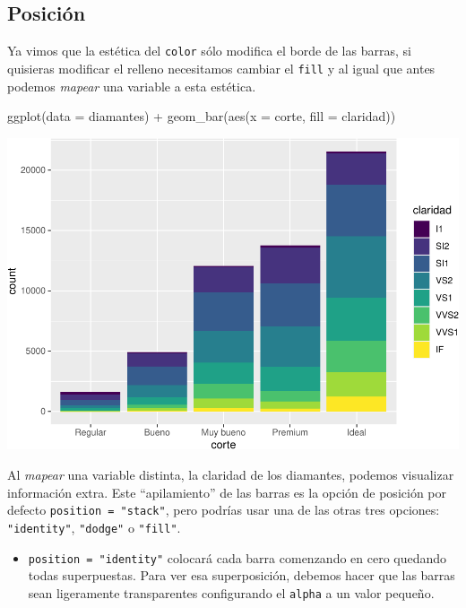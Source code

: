 \documentclass[
  openany]{book}
\newenvironment{Shaded}{\begin{snugshade}}{\end{snugshade}}
\newcommand{\AttributeTok}[1]{\textcolor[rgb]{0.77,0.63,0.00}{#1}}
\newcommand{\FunctionTok}[1]{\textcolor[rgb]{0.00,0.00,0.00}{#1}}
\newcommand{\NormalTok}[1]{#1}
\newcommand{\SpecialCharTok}[1]{\textcolor[rgb]{0.00,0.00,0.00}{#1}}
\providecommand{\tightlist}{%
  \setlength{\itemsep}{0pt}\setlength{\parskip}{0pt}}
\begin{document}
\hypertarget{posiciuxf3n}{%
\subsection{Posición}\label{posiciuxf3n}}

Ya vimos que la estética del \texttt{color} sólo modifica el borde de las barras, si quisieras modificar el relleno necesitamos cambiar el \texttt{fill} y al igual que antes podemos \emph{mapear} una variable a esta estética.

\begin{Shaded}
\begin{Highlighting}[]
\FunctionTok{ggplot}\NormalTok{(}\AttributeTok{data =}\NormalTok{ diamantes) }\SpecialCharTok{+}
  \FunctionTok{geom\_bar}\NormalTok{(}\FunctionTok{aes}\NormalTok{(}\AttributeTok{x =}\NormalTok{ corte, }\AttributeTok{fill =}\NormalTok{ claridad))}
\end{Highlighting}
\end{Shaded}

\begin{center}\includegraphics[width=1\linewidth]{DT6_files/figure-latex/unnamed-chunk-63-1} \end{center}

Al \emph{mapear} una variable distinta, la claridad de los diamantes, podemos visualizar información extra.
Este ``apilamiento'' de las barras es la opción de posición por defecto \texttt{position\ =\ "stack"}, pero podrías usar una de las otras tres opciones: \texttt{"identity"}, \texttt{"dodge"} o \texttt{"fill"}.

\begin{itemize}
\tightlist
\item
  \texttt{position\ =\ "identity"} colocará cada barra comenzando en cero quedando todas superpuestas. Para ver esa superposición, debemos hacer que las barras sean ligeramente transparentes configurando el \texttt{alpha} a un valor pequeño.
\end{itemize}
\end{document}
